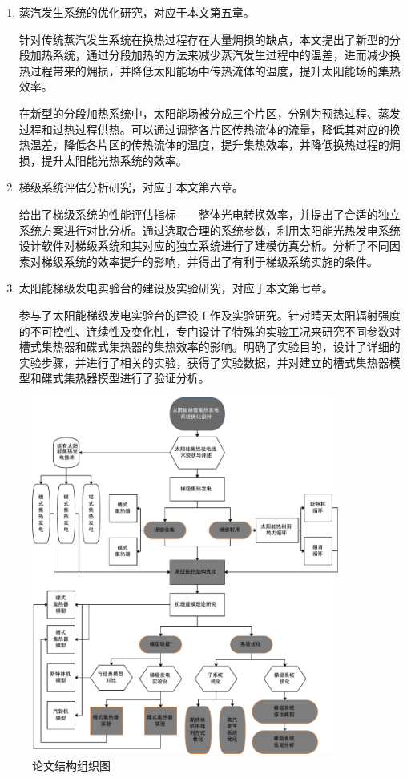 \begin{enumerate}[label=(\arabic*)]
	\item 蒸汽发生系统的优化研究，对应于本文第五章。
	
	针对传统蒸汽发生系统在换热过程存在大量㶲损的缺点，本文提出了新型的分段加热系统，通过分段加热的方法来减少蒸汽发生过程中的温差，进而减少换热过程带来的㶲损，并降低太阳能场中传热流体的温度，提升太阳能场的集热效率。
	
	在新型的分段加热系统中，太阳能场被分成三个片区，分别为预热过程、蒸发过程和过热过程供热。可以通过调整各片区传热流体的流量，降低其对应的换热温差，降低各片区的传热流体的温度，提升集热效率，并降低换热过程的㶲损，提升太阳能光热系统的效率。

	\item 梯级系统评估分析研究，对应于本文第六章。
	
	给出了梯级系统的性能评估指标——整体光电转换效率，并提出了合适的独立系统方案进行对比分析。通过选取合理的系统参数，利用太阳能光热发电系统设计软件对梯级系统和其对应的独立系统进行了建模仿真分析。分析了不同因素对梯级系统的效率提升的影响，并得出了有利于梯级系统实施的条件。

	\item 太阳能梯级发电实验台的建设及实验研究，对应于本文第七章。
	
	参与了太阳能梯级发电实验台的建设工作及实验研究。针对晴天太阳辐射强度的不可控性、连续性及变化性，专门设计了特殊的实验工况来研究不同参数对槽式集热器和碟式集热器的集热效率的影响。明确了实验目的，设计了详细的实验步骤，并进行了相关的实验，获得了实验数据，并对建立的槽式集热器模型和碟式集热器模型进行了验证分析。
\end{enumerate}


\begin{figure}[htbp]
\centering
\includegraphics[width=0.9\textwidth]{fig/ThesisStructure2}
\caption{论文结构组织图}
\label{fig:ThesisStructure}
\end{figure}

